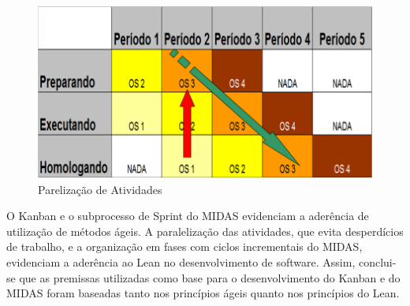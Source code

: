\begin{figure}[H]
		\centering
		\label{fig09}
			\includegraphics[scale=0.5]{figuras/kanbanIPHAN5.png}
		\caption{Parelização de Atividades \cite{parente}}
\end{figure}

O Kanban e o subprocesso de Sprint do MIDAS evidenciam a aderência de utilização de métodos ágeis. A paralelização das atividades, que evita desperdícios de trabalho, e a organização em fases com ciclos incrementais do MIDAS, evidenciam a aderência ao Lean no desenvolvimento de software. Assim, conclui-se que as premissas utilizadas como base para o desenvolvimento do Kanban e do MIDAS foram baseadas tanto nos princípios ágeis quanto nos princípios do Lean.
